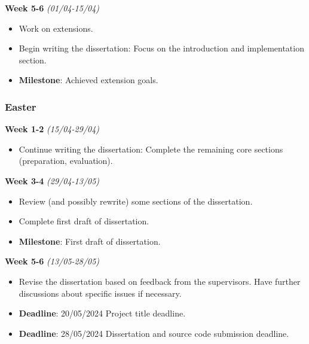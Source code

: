 \textbf{Week 5-6} \emph{(01/04-15/04)}
\begin{itemize}
    \item Work on extensions.
    \item Begin writing the dissertation: Focus on the introduction and implementation section.
    \item \textbf{Milestone}: Achieved extension goals.
\end{itemize}

\subsubsection*{Easter}
\textbf{Week 1-2} \emph{(15/04-29/04)}
\begin{itemize}
    \item Continue writing the dissertation: Complete the remaining core sections (preparation, evaluation).
\end{itemize}

\textbf{Week 3-4} \emph{(29/04-13/05)}
\begin{itemize}
    \item Review (and possibly rewrite) some sections of the dissertation.
    \item Complete first draft of dissertation.
    \item \textbf{Milestone}: First draft of dissertation.
\end{itemize}

\textbf{Week 5-6} \emph{(13/05-28/05)}
\begin{itemize}
    \item Revise the dissertation based on feedback from the supervisors. Have further discussions about specific issues if necessary.
    \item \textbf{Deadline}: 20/05/2024 Project title deadline.
    \item \textbf{Deadline}: 28/05/2024 Dissertation and source code submission deadline.
\end{itemize}